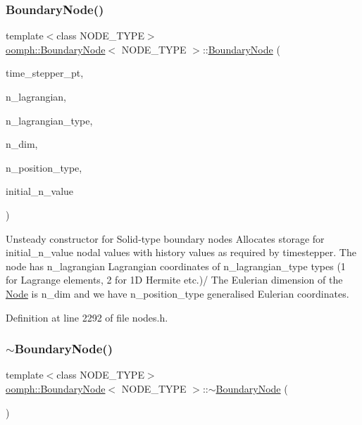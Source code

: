 \subsubsection{\texorpdfstring{Boundary\+Node()}{BoundaryNode()}\hspace{0.1cm}{\footnotesize\ttfamily [5/6]}}
{\footnotesize\ttfamily template$<$class N\+O\+D\+E\+\_\+\+T\+Y\+PE$>$ \\
\hyperlink{classoomph_1_1BoundaryNode}{oomph\+::\+Boundary\+Node}$<$ N\+O\+D\+E\+\_\+\+T\+Y\+PE $>$\+::\hyperlink{classoomph_1_1BoundaryNode}{Boundary\+Node} (\begin{DoxyParamCaption}\item[{\hyperlink{classoomph_1_1TimeStepper}{Time\+Stepper} $\ast$const \&}]{time\+\_\+stepper\+\_\+pt,  }\item[{const unsigned \&}]{n\+\_\+lagrangian,  }\item[{const unsigned \&}]{n\+\_\+lagrangian\+\_\+type,  }\item[{const unsigned \&}]{n\+\_\+dim,  }\item[{const unsigned \&}]{n\+\_\+position\+\_\+type,  }\item[{const unsigned \&}]{initial\+\_\+n\+\_\+value }\end{DoxyParamCaption})\hspace{0.3cm}{\ttfamily [inline]}}



Unsteady constructor for Solid-\/type boundary nodes Allocates storage for initial\+\_\+n\+\_\+value nodal values with history values as required by timestepper. The node has n\+\_\+lagrangian Lagrangian coordinates of n\+\_\+lagrangian\+\_\+type types (1 for Lagrange elements, 2 for 1D Hermite etc.)/ The Eulerian dimension of the \hyperlink{classoomph_1_1Node}{Node} is n\+\_\+dim and we have n\+\_\+position\+\_\+type generalised Eulerian coordinates. 



Definition at line 2292 of file nodes.\+h.

\mbox{\label{classoomph_1_1BoundaryNode_a29f6d775e2f97943ad0588ed4df5de51}} 
\subsubsection{\texorpdfstring{$\sim$\+Boundary\+Node()}{~BoundaryNode()}}
{\footnotesize\ttfamily template$<$class N\+O\+D\+E\+\_\+\+T\+Y\+PE$>$ \\
\hyperlink{classoomph_1_1BoundaryNode}{oomph\+::\+Boundary\+Node}$<$ N\+O\+D\+E\+\_\+\+T\+Y\+PE $>$\+::$\sim$\hyperlink{classoomph_1_1BoundaryNode}{Boundary\+Node} (\begin{DoxyParamCaption}{ }\end{DoxyParamCaption})\hspace{0.3cm}{\ttfamily [inline]}}



